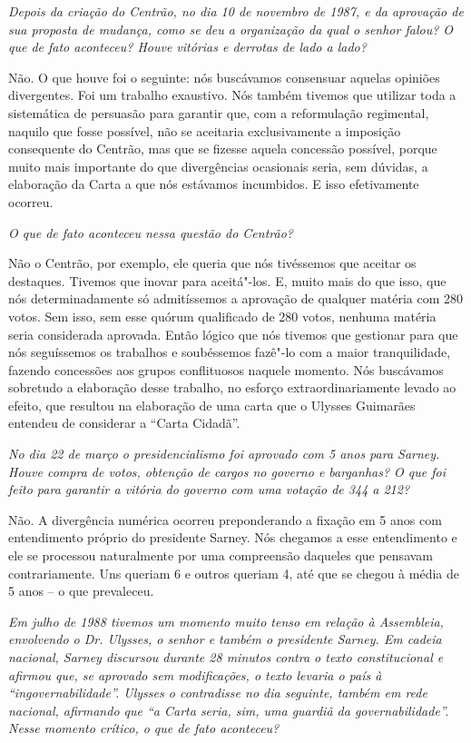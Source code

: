 \medskip

\noindent\emph{Depois da criação do Centrão, no dia 10 de novembro de 1987, e
da aprovação de sua proposta de mudança, como se deu a organização da
qual o senhor falou? O que de fato aconteceu? Houve vitórias e derrotas
de lado a lado?}

Não. O que houve foi o seguinte: nós buscávamos
consensuar aquelas opiniões divergentes. Foi um trabalho exaustivo. Nós
também tivemos que utilizar toda a sistemática de persuasão para
garantir que, com a reformulação regimental, naquilo que fosse possível,
não se aceitaria exclusivamente a imposição consequente do Centrão, mas
que se fizesse aquela concessão possível, porque muito mais importante
do que divergências ocasionais seria, sem dúvidas, a elaboração da Carta
a que nós estávamos incumbidos. E isso efetivamente ocorreu.

\medskip

\noindent\emph{O que de fato aconteceu nessa questão do Centrão?}

Não o Centrão, por exemplo, ele queria que nós
tivéssemos que aceitar os destaques. Tivemos que inovar para aceitá"-los.
E, muito mais do que isso, que nós determinadamente só admitíssemos a
aprovação de qualquer matéria com 280 votos. Sem isso, sem esse quórum
qualificado de 280 votos, nenhuma matéria seria considerada aprovada.
Então lógico que nós tivemos que gestionar para que nós seguíssemos os
trabalhos e soubéssemos fazê"-lo com a maior tranquilidade, fazendo
concessões aos grupos conflituosos naquele momento. Nós buscávamos
sobretudo a elaboração desse trabalho, no esforço extraordinariamente
levado ao efeito, que resultou na elaboração de uma carta que o Ulysses
Guimarães entendeu de considerar a ``Carta Cidadã''.

\medskip

\noindent\emph{No dia 22 de março o presidencialismo foi aprovado com 5 anos
para Sarney. Houve compra de votos, obtenção de cargos no governo e
barganhas? O que foi feito para garantir a vitória do governo com uma
votação de 344 a 212?}

Não. A divergência numérica ocorreu preponderando a
fixação em 5 anos com entendimento próprio do presidente Sarney. Nós
chegamos a esse entendimento e ele se processou naturalmente por uma
compreensão daqueles que pensavam contrariamente. Uns queriam 6 e outros
queriam 4, até que se chegou à média de 5 anos -- o que prevaleceu.

\medskip

\noindent\emph{Em julho de 1988 tivemos um momento muito tenso em relação à
Assembleia, envolvendo o Dr. Ulysses, o senhor e também o presidente
Sarney. Em cadeia nacional, Sarney discursou durante 28 minutos contra o
texto constitucional e afirmou que, se aprovado sem modificações, o
texto levaria o país à ``ingovernabilidade''. Ulysses o contradisse no
dia seguinte, também em rede nacional, afirmando que ``a Carta seria,
sim, uma guardiã da governabilidade''. Nesse momento crítico, o que de
fato aconteceu?}

